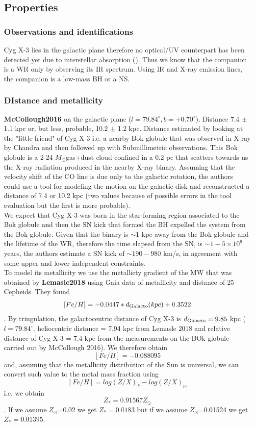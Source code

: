 \documentclass[a4paper,titlepage]{book}     	%
\newcommand{\sun}{\ensuremath{_\odot}}
\newcommand{\msun}{\ensuremath{M\sun}}
\newcommand{\zsun}{\ensuremath{Z\sun}}
\begin{document}
\subsection{Properties}

\subsubsection{Observations and identifications}
Cyg X-3 lies in the galactic plane therefore no optical/UV counterpart has been detected yet due to interstellar absorption (\cite{CygX-3_Koljonen2017}). Thus we know that the companion is a WR only by observing its IR spectrum. Using IR and X-ray emission lines, the companion is a low-mass BH or a NS.

\subsubsection{DIstance and metallicity}
\textbf{McCollough2016} on the galactic plane ($l=79.84^\circ, b=+0.70^\circ$). Distance 7.4 $\pm$ 1.1 kpc or, but less, probable, 10.2 $\pm$ 1.2 kpc. Distance estimated by looking at the "little friend" of Cyg X-3 i.e. a nearby Bok globule that was observed in X-ray by Chandra and then followed up with Submillimetric observations. This Bok globule is a 2-24 \msun gas+dust cloud confined in a 0.2 pc that scatters towards us the X-ray radiation produced in the nearby X-ray binary. Assuming that the velocity shift of the CO line is due only to the galactic rotation, the authors could use a tool for modeling the motion on the galactic disk and reconstructed a distance of 7.4 or 10.2 kpc (two values because of possible errors in the tool evaluation but the first is more probable).\\

We expect that Cyg X-3 was born in the star-forming region associated to the Bok globule and then the SN kick that formed the BH expelled the system from the Bok globule. Given that the binary is $\sim 1$ kpc away from the Bok globule and the lifetime of the WR, therefore the time elapsed from the SN, is $\sim 1-5 \times 10^6$ years, the authors estimate a SN kick of $\sim 190-980$ km/s, in agreement with some upper and lower independent constraints.\\

To model its metallicity we use the metallicty gradient of the MW that was obtained by \textbf{Lemasle2018} using Gaia data of metallicity and distance of 25 Cepheids. They found \[[Fe/H]=-0.0447*d_{\rm Galacto}(kpc) + 0.3522\]. By tringulation, the galactocentric distance of Cyg X-3 is $d_{\rm Galacto} = 9.85$ kpc ($l=79.84^\circ$, heliocentric distance = 7.94 kpc from Lemasle 2018 and relative distance of Cyg X-3 = 7.4 kpc from the measurements on the BOk globule carried out by McCollough 2016). We therefore obtain \[[Fe/H] = -0.088095\] and, assuming that the metallicity distribution of the Sun is universal, we can convert such value to the metal mass fraction using \[[Fe/H] = log(Z/X)_* - log(Z/X)_\odot\] i.e. we obtain \[Z_* = 0.91567 \zsun\]. If we assume \zsun=0.02 we get $Z_*=0.0183$ but if we assume \zsun=0.01524 we get $Z_*=0.01395$.
\end{document}
